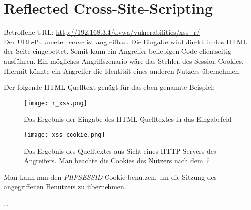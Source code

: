 \documentclass[a4paper, 12pt]{report}
\begin{document}
\section{Reflected Cross-Site-Scripting}
\label{rxss}

Betroffene URL: \url{http://192.168.3.4/dvwa/vulnerabilities/xss_r/} \\

Der URL-Parameter \emph{name} ist angreifbar.
Die Eingabe wird direkt in das HTML der Seite eingebettet.
Somit kann ein Angreifer beliebigen Code clientseitig ausführen.
Ein mögliches Angriffszenario wäre das Stehlen des Session-Cookies.
Hiermit könnte ein Angreifer die Identität eines anderen Nutzers übernehmen.

Der folgende HTML-Quelltext genügt für das eben genannte Beispiel:


\begin{figure}
    \texttt{[image: r\_xss.png]}
    \caption{Das Ergebnis der Eingabe des HTML-Quelltextes in das Eingabefeld}
\end{figure}

\begin{figure}
    \texttt{[image: xss\_cookie.png]}
    \caption{Das Ergebnis des Quelltextes aus Sicht eines HTTP-Servers des Angreifers. Man beachte die Cookies des Nutzers nach dem \emph{?}}
\end{figure}

Man kann nun den \emph{PHPSESSID}-Cookie benutzen, um die Sitzung des angegriffenen Benutzers zu übernehmen.

\ldots
\end{document}
